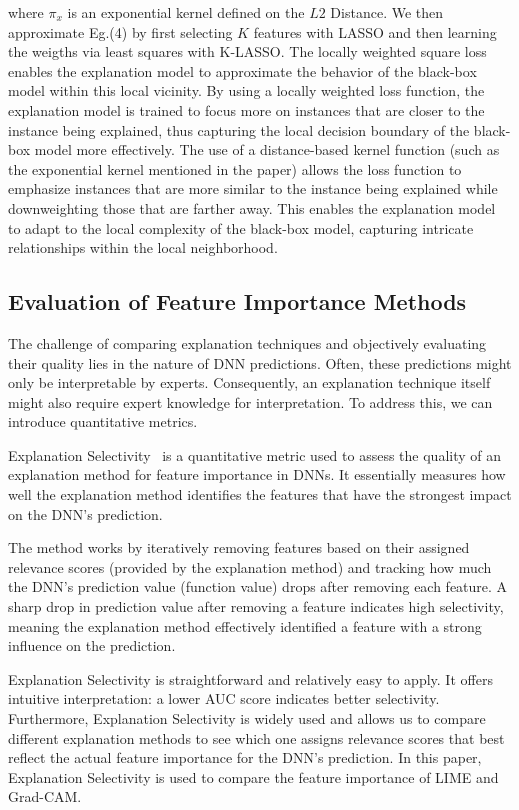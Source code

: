 \documentclass{article}
\begin{document}
where $\pi_x$ is an exponential kernel defined on the $L2$ Distance. We then approximate Eg.(4) by first selecting $K$ features with LASSO and then learning the weigths via least squares with K-LASSO.
The locally weighted square loss enables the explanation model to approximate the behavior of the black-box model within this local vicinity.
By using a locally weighted loss function, the explanation model is trained to focus more on instances that are closer to the instance being explained, thus capturing the local decision boundary of the black-box model more effectively.
The use of a distance-based kernel function (such as the exponential kernel mentioned in the paper) allows the loss function to emphasize instances that are more similar to the instance being explained while downweighting those that are farther away. This enables the explanation model to adapt to the local complexity of the black-box model, capturing intricate relationships within the local neighborhood. 


\subsection{Evaluation of Feature Importance Methods}
The challenge of comparing explanation techniques and objectively evaluating their quality lies in the nature of DNN predictions. Often, these predictions might only be interpretable by experts. Consequently, an explanation technique itself might also require expert knowledge for interpretation. To address this, we can introduce quantitative metrics.

Explanation Selectivity~\cite{MONTAVON20181} is a quantitative metric used to assess the quality of an explanation method for feature importance in DNNs. It essentially measures how well the explanation method identifies the features that have the strongest impact on the DNN's prediction.

The method works by iteratively removing features based on their assigned relevance scores (provided by the explanation method) and tracking how much the DNN's prediction value (function value) drops after removing each feature. A sharp drop in prediction value after removing a feature indicates high selectivity, meaning the explanation method effectively identified a feature with a strong influence on the prediction.

Explanation Selectivity is straightforward and relatively easy to apply. It offers intuitive interpretation: a lower AUC score indicates better selectivity. Furthermore, Explanation Selectivity is widely used and allows us to compare different explanation methods to see which one assigns relevance scores that best reflect the actual feature importance for the DNN's prediction. In this paper, Explanation Selectivity is used to compare the feature importance of LIME and Grad-CAM.
\end{document}

